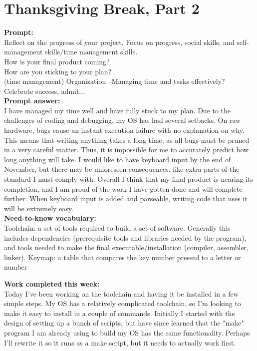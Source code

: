 \documentclass[11pt]{article}
\begin{document}
\section{Thanksgiving Break, Part 2}
\textbf{Prompt:}\\
Reflect on the progress of your project. Focus on progress, social skills, and self-management skills/time management skills.\\
How is your final product coming?\\
How are you sticking to your plan? \\
(time management) Organization –Managing time and tasks effectively?\\
Celebrate success, admit...\\
\textbf{Prompt answer:}\\
I have managed my time well and have fully stuck to my plan. Due to the challenges of coding and debugging, my OS has had several setbacks. On raw hardware, bugs cause an instant execution failure with no explanation on why. This means that writing anything takes a long time, as all bugs must be pruned in a very careful matter. Thus, it is impossible for me to accurately predict how long anything will take. I would like to have keyboard input by the end of November, but there may be unforeseen consequences, like extra parts of the standard I must comply with. Overall I think that my final product is nearing its completion, and I am proud of the work I have gotten done and will complete further. When keyboard input is added and parseable, writing code that uses it will be extremely easy.\\
\textbf{Need-to-know vocabulary:}\\
Toolchain: a set of tools required to build a set of software. Generally this includes dependencies (prerequisite tools and libraries needed by the program), and tools needed to make the final executable/installation (compiler, assembler, linker).
Keymap: a table that compares the key number pressed to a letter or number

\textbf{Work completed this week:}\\
Today I've been working on the toolchain and having it be installed in a few simple steps. My OS has a relatively complicated toolchain, so I'm looking to make it easy to install in a couple of commands. Initially I started with the design of setting up a bunch of scripts, but have since learned that the "make" program I am already using to build my OS has the same functionality. Perhaps I'll rewrite it so it runs as a make script, but it needs to actually work first.
\end{document}
